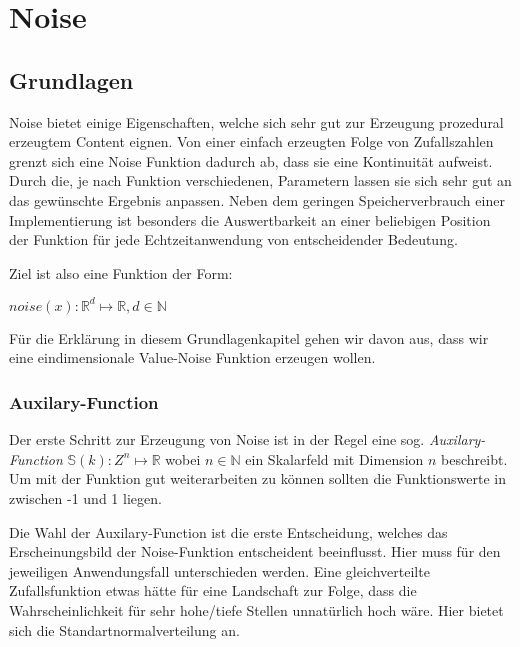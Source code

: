 \chapter{Noise}
\section{Grundlagen}
Noise bietet einige Eigenschaften, welche sich sehr gut zur Erzeugung prozedural erzeugtem Content eignen.
Von einer einfach erzeugten Folge von Zufallszahlen grenzt sich eine Noise Funktion dadurch ab, dass sie eine Kontinuität aufweist.
Durch die, je nach Funktion verschiedenen, Parametern lassen sie sich sehr gut an das gewünschte Ergebnis anpassen. Neben dem geringen Speicherverbrauch einer Implementierung ist besonders die Auswertbarkeit an einer beliebigen Position der Funktion für jede Echtzeitanwendung von entscheidender Bedeutung.

Ziel ist also eine Funktion der Form:

\begin{math}
	noise(x): \mathbb{R}^d \mapsto \mathbb{R}, d \in \mathbb{N}
\end{math}

Für die Erklärung in diesem Grundlagenkapitel gehen wir davon aus, dass wir eine eindimensionale Value-Noise Funktion erzeugen wollen.


\subsection{Auxilary-Function}\label{auxFunc}
Der erste Schritt zur Erzeugung von Noise ist in der Regel eine sog. \emph{Auxilary-Function}\cite{fractalsAndChaos} \begin{math}\mathbb S(k): {Z}^n \mapsto \mathbb{R}\end{math} wobei $n\in\mathbb{N}$ ein Skalarfeld mit Dimension $n$ beschreibt.
Um mit der Funktion gut weiterarbeiten zu können sollten die Funktionswerte in zwischen -1 und 1 liegen.

Die Wahl der Auxilary-Function ist die erste Entscheidung, welches das Erscheinungsbild der Noise-Funktion entscheident beeinflusst.
Hier muss für den jeweiligen Anwendungsfall unterschieden werden. Eine gleichverteilte Zufallsfunktion etwas hätte für eine Landschaft zur Folge, dass die Wahrscheinlichkeit für sehr hohe/tiefe Stellen unnatürlich hoch wäre. Hier bietet sich die Standartnormalverteilung an.

